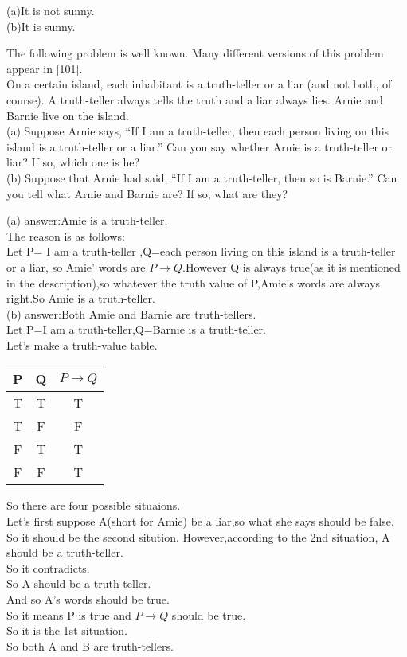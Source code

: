 \documentclass[11pt, a4paper, UTF8]{ctexart}
\begin{document}
\begin{solution}
(a)It is not sunny.\\
(b)It is sunny.
\end{solution}




\begin{problem}[UD:2.11]
The following problem is well known. Many different versions of this problem appear in [101].\\
On a certain island, each inhabitant is a truth-teller or a liar (and not both, of course). A truth-teller always tells the truth and a liar always lies. Arnie and Barnie live on the island.\\
 (a) Suppose Arnie says, “If I am a truth-teller, then each person living on this island is a truth-teller or a liar.” Can you say whether Arnie is a truth-teller or liar? If so, which one is he?\\
 (b) Suppose that Arnie had said, “If I am a truth-teller, then so is Barnie.” Can you tell what Arnie and Barnie are? If so, what are they?
\end{problem}

\begin{solution}
(a) answer:Amie is a truth-teller.\\
The reason is as follows:\\
Let P= I am a truth-teller ,Q=each person living on this island is a truth-teller or a liar,
so Amie' words are $P \rightarrow Q$.However Q is always true(as it is mentioned in the description),so whatever 
the truth value of P,Amie's words are always right.So Amie is a truth-teller.\\
(b) answer:Both Amie and Barnie are truth-tellers.\\
Let P=I am a truth-teller,Q=Barnie is a truth-teller.\\
Let's make a truth-value table.\\
\begin{tabular}{|c|c|c|}
\hline
P & Q &$P \rightarrow Q$\\
\hline
T & T & T \\
\hline
T & F & F \\
\hline
F & T & T \\
\hline
F & F & T \\
\hline
\end{tabular} 
So there are four possible situaions.\\
Let's first suppose A(short for Amie) be a liar,so what she says should be false.\\
So it should be the second sitution. However,according to the 2nd situation, A should be a truth-teller.\\
So it contradicts.\\
So A should be a truth-teller.\\
And so A's words should be true.\\
So it means P is true and $ P \rightarrow Q $ should be true.\\
So it is the 1st situation.\\
So both A and B are truth-tellers.

\end{solution}
\end{document}
